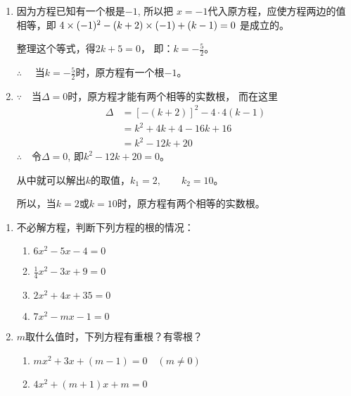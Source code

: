 \begin{solution}
\begin{enumerate}
    \item 因为方程已知有一个根是$-1$, 所以把
$x=-1$代入原方程，应使方程两边的值相等，即
$4\times(-1)^2-(k+2)\times(-1)+(k-1)=0$ 是成立的。

整理这个等式，得$2k+5=0$，
即：$k=-\frac{5}{2}$。

$\therefore\quad $ 当$k=-\frac{5}{2}$时，原方程有一个根$-1$。

\item $\because\quad $当$\Delta =0$时，原方程才能有两个相等的实数根，
而在这里
\[\begin{split}
    \Delta &=[-(k+2)]^2-4\cdot 4(k-1)\\
    &=k^2+4k+4-16k+16\\
    &=k^2-12k+20
\end{split}\]
$\therefore\quad $令$\Delta=0$, 即$k^2-12k+20=0$。

从中就可以解出$k$的取值，$k_1=2,\qquad k_2=10$。

所以，当$k=2$或$k=10$时，原方程有两个相等的实数根。

\end{enumerate}
\end{solution}

\begin{ex}
\begin{enumerate}
    \item 不必解方程，判断下列方程的根的情况：
    \begin{multicols}{2}
    \begin{enumerate}
        \item $6x^2-5x-4=0$
        \item $\frac{1}{4}x^2-3x+9=0$
        \item $2x^2+4x+35=0$
        \item $7x^2-mx-1=0$
    \end{enumerate}
    \end{multicols}
    
    \item $m$取什么值时，下列方程有重根？有零根？
    \begin{enumerate}
        \item $mx^2+3x+(m-1)=0\quad  (m\ne 0)$
        \item $4x^2+(m+1)x+m=0$
    \end{enumerate}
\end{enumerate}
\end{ex}

